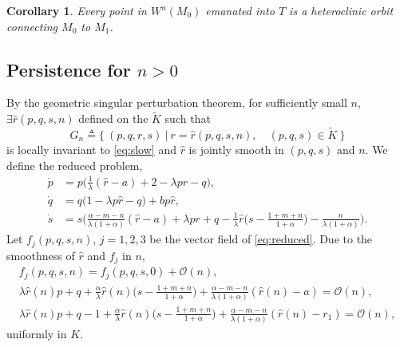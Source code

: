 \documentclass[a4paper,11pt]{article}
\newtheorem{corollary}{Corollary}[section]
\begin{document}
\begin{corollary}
 Every point in $W^u(M_0)$ emanated into $T$ is a heteroclinic orbit connecting $M_0$ to $M_1$.
\end{corollary}

\subsection{Persistence for $n>0$}
By the geometric singular perturbation theorem, for sufficiently small $n$, $\exists \hat{r}(p,q,s,n)$ defined on the $\tilde{K}$ such that
$$G_n\triangleq \{\:(p,q,r,s)\: | \: r=\hat{r}(p,q,s,n), \quad (p,q,s)\in \tilde{K}\:\}$$
is locally invariant to \eqref{eq:slow} and $\hat{r}$ is jointly smooth in $(p,q,s)$ and $n$.
We define the reduced problem,
\begin{equation} \label{eq:reduced}
 \begin{aligned}
 \dot{p} &=p\Big(\frac{1}{\lambda}(\hat{r}-a) + 2- \lambda p r -q\Big),\\
 \dot{q} &=q\Big(1 -\lambda p \hat{r} -q\Big) + b p \hat{r},\\
 \dot{s} &=s\Big(\frac{\alpha-m-n}{\lambda(1+\alpha)}(\hat{r}-a) + \lambda pr + q - \frac{1}{\lambda}\hat{r}\big(s- \frac{1+m+n}{1+\alpha}\big) - \frac{n}{\lambda(1+\alpha)}\Big).
 \end{aligned}
\end{equation}
Let $f_j(p,q,s,n)$, $j=1,2,3$ be the vector field of \eqref{eq:reduced}.
Due to the smoothness of $\hat{r}$ and $f_j$ in $n$, 
\begin{equation} \label{eq:uniform}
 \begin{aligned}
f_j(p,q,s,n) = f_j(p,q,s,0) +\mathcal{O}(n),\\
 \lambda \hat{r}(n)p + q +\frac{\alpha}{\lambda}\hat{r}(n)\big(s- \frac{1+m+n}{1+\alpha}\big) + \frac{\alpha-m-n}{\lambda(1+\alpha)}(\hat{r}(n)-a) = \mathcal{O}(n),\\
   \lambda \hat{r}(n)p + q-1 +\frac{\alpha}{\lambda}\hat{r}(n)\big(s- \frac{1+m+n}{1+\alpha}\big) + \frac{\alpha-m-n}{\lambda(1+\alpha)}(\hat{r}(n)-r_1) = \mathcal{O}(n),
 \end{aligned}
\end{equation}
uniformly in $K$.
\end{document}
